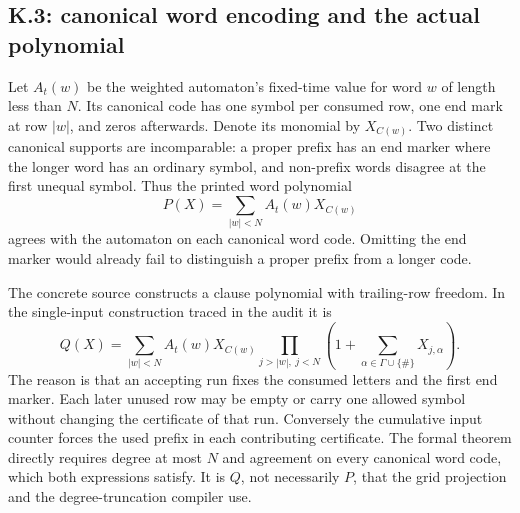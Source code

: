 \documentclass[11pt,letterpaper]{article}
\theoremstyle{definition}\newtheorem{definition}[theorem]{Definition}\newtheorem{example}[theorem]{Example}
\theoremstyle{remark}\newtheorem{remark}[theorem]{Remark}
\begin{document}
\subsection{K.3: canonical word encoding and the actual polynomial}\label{sec:k3}
Let $A_t(w)$ be the weighted automaton's fixed-time value for word $w$ of length less than $N$. Its canonical code has one symbol per consumed row, one end mark at row $|w|$, and zeros afterwards. Denote its monomial by $X_{C(w)}$. Two distinct canonical supports are incomparable: a proper prefix has an end marker where the longer word has an ordinary symbol, and non-prefix words disagree at the first unequal symbol. Thus the printed word polynomial
\[
 P(X)=\sum_{|w|<N}A_t(w)X_{C(w)}
\]
agrees with the automaton on each canonical word code. Omitting the end marker would already fail to distinguish a proper prefix from a longer code.

The concrete source constructs a clause polynomial with trailing-row freedom. In the single-input construction traced in the audit it is
\begin{equation}\label{eq:clause}
 Q(X)=\sum_{|w|<N} A_t(w)X_{C(w)}
     \prod_{j>|w|,\ j<N}\left(1+\sum_{\alpha\in\Gamma\cup\{\#\}}X_{j,\alpha}\right).
\end{equation}
The reason is that an accepting run fixes the consumed letters and the first end marker. Each later unused row may be empty or carry one allowed symbol without changing the certificate of that run. Conversely the cumulative input counter forces the used prefix in each contributing certificate. The formal theorem directly requires degree at most $N$ and agreement on every canonical word code, which both expressions satisfy. It is $Q$, not necessarily $P$, that the grid projection and the degree-truncation compiler use.
\end{document}
